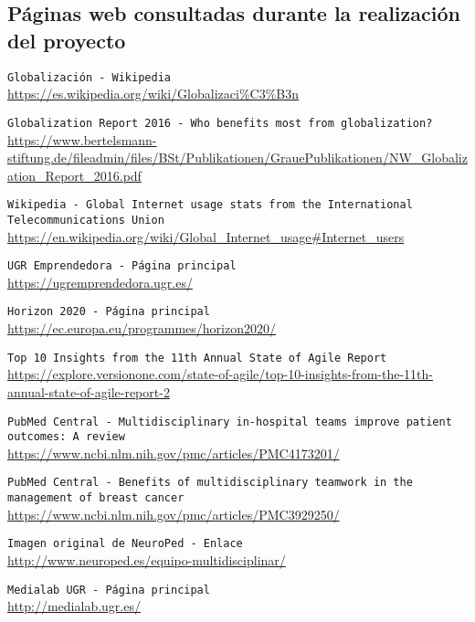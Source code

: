 
\subsection*{Páginas web consultadas durante la realización del proyecto}

 {\tt Globalización - Wikipedia}\\
\url{https://es.wikipedia.org/wiki/Globalizaci%C3%B3n}

 {\tt Globalization Report 2016 - Who benefits most from globalization?}\\
\url{https://www.bertelsmann-stiftung.de/fileadmin/files/BSt/Publikationen/GrauePublikationen/NW_Globalization_Report_2016.pdf}

 {\tt Wikipedia - Global Internet usage stats from the International Telecommunications Union}\\
\url{https://en.wikipedia.org/wiki/Global_Internet_usage#Internet_users}

 {\tt UGR Emprendedora - Página principal}\\
\url{https://ugremprendedora.ugr.es/}

 {\tt Horizon 2020 - Página principal}\\
\url{https://ec.europa.eu/programmes/horizon2020/}

 {\tt Top 10 Insights from the 11th Annual State of Agile Report}\\
\url{https://explore.versionone.com/state-of-agile/top-10-insights-from-the-11th-annual-state-of-agile-report-2}

 {\tt PubMed Central - Multidisciplinary in-hospital teams improve patient outcomes: A review}\\
\url{https://www.ncbi.nlm.nih.gov/pmc/articles/PMC4173201/}

 {\tt PubMed Central - Benefits of multidisciplinary teamwork in the management of breast cancer}\\
\url{https://www.ncbi.nlm.nih.gov/pmc/articles/PMC3929250/}

 {\tt Imagen original de NeuroPed - Enlace}\\
\url{http://www.neuroped.es/equipo-multidisciplinar/}

 {\tt Medialab UGR - Página principal}\\
\url{http://medialab.ugr.es/}

